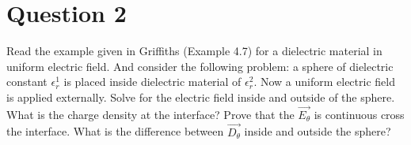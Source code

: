 \documentclass[a4paper,12pt]{article}
\newcommand{\V}[1]{\ensuremath{\vec{#1}}}
\newcommand{\Q}[1]{\newpage \section*{#1}}
\begin{document}
\Q{Question 2}
Read the example given in Griffiths (Example 4.7) for a dielectric material in uniform electric field.  And consider the following problem: a sphere of dielectric constant $\epsilon_r^1$ is placed inside dielectric material of $\epsilon_r^2$.  Now a uniform electric field is applied externally.  Solve for the electric field inside and outside of the sphere.  What is the charge density at the interface?  Prove that the $\V{E_\theta}$ is continuous cross the interface.  What is the difference between $\V{D_\theta}$ inside and outside the sphere?
\end{document}
